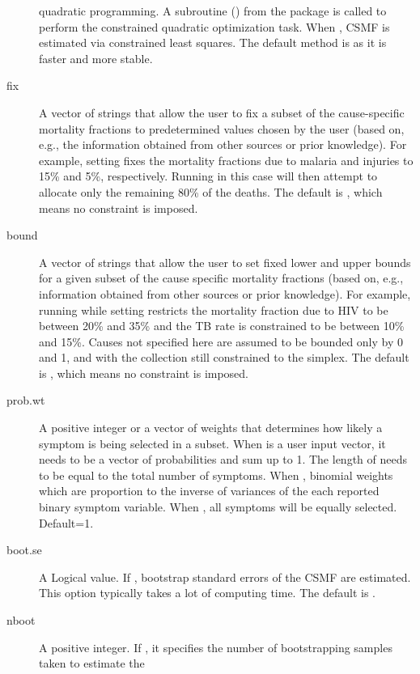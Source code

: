 \documentclass[oneside,letterpaper,titlepage]{article}
\begin{document}
\begin{description}
quadratic programming. A subroutine () from the 
 package is called to perform the constrained 
quadratic optimization task. When ,
CSMF is estimated via constrained least squares. The default method
is  as it is faster and more stable. 
\item[fix] A vector of strings that allow the user to fix a subset of
  the cause-specific mortality fractions to predetermined values
  chosen by the user (based on, e.g., the information obtained from
  other sources or prior knowledge).  For example, setting
   fixes the mortality
  fractions due to malaria and injuries to 15\% and 5\%, respectively.
  Running  in this case will then attempt to allocate only the
  remaining 80\% of the deaths.  The default is , which
  means no constraint is imposed.
\item[bound] A vector of strings that allow the user to set fixed
  lower and upper bounds for a given subset of the cause specific
  mortality fractions (based on, e.g., information obtained from other
  sources or prior knowledge).  For example, running  while setting
   restricts
  the mortality fraction due to HIV to be between 20\% and 35\% and the
  TB rate is constrained to be between 10\% and 15\%.  Causes not
  specified here are assumed to be bounded only by 0 and 1, and with
  the collection still constrained to the simplex.  The default is
  , which means no constraint is imposed.
\item[prob.wt] A positive integer or a vector of weights that 
  determines how likely a symptom is being selected in a subset. 
  When  is a user input vector, it needs to be a vector 
  of probabilities and sum up to 1. The length of  
  needs to be equal to the total number of symptoms. 
  When , binomial weights which are proportion to 
  the inverse of variances of the each reported binary symptom variable.   
  When , all symptoms will be equally selected. 
  Default=1.
\item[boot.se] A Logical value. If , bootstrap standard
  errors of the CSMF are estimated.  This option typically takes a lot
  of computing time. The default is .
\item[nboot] A positive integer. If , it
  specifies the number of bootstrapping samples taken to estimate the

\end{description}
\end{document}
